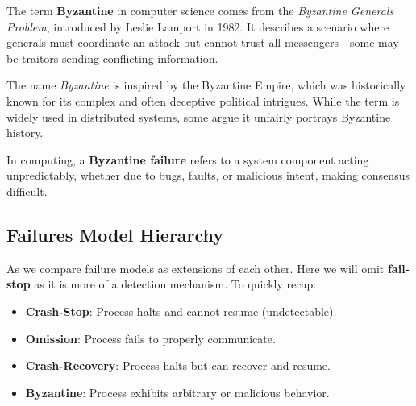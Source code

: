 \begin{Tip} The term \textbf{Byzantine} in computer science comes from the \textit{Byzantine Generals Problem}, introduced by Leslie Lamport in 1982. It describes a scenario where generals must coordinate an attack but cannot trust all messengers—some may be traitors sending conflicting information.

    The name \textit{Byzantine} is inspired by the Byzantine Empire, which was historically known for its complex and often deceptive political intrigues. While the term is widely used in distributed systems, some argue it unfairly portrays Byzantine history.

    In computing, a \textbf{Byzantine failure} refers to a system component acting unpredictably, whether due to bugs, faults, or malicious intent, making consensus difficult.

\end{Tip}

\newpage

\subsection{Failures Model Hierarchy}

As we compare failure models as extensions of each other. Here we will omit \textbf{fail-stop} as it is more of a detection mechanism.
To quickly recap:
\begin{itemize}
    \item \textbf{Crash-Stop}: Process halts and cannot resume (undetectable).
    \item \textbf{Omission}: Process fails to properly communicate.
    \item \textbf{Crash-Recovery}: Process halts but can recover and resume.
    \item \textbf{Byzantine}: Process exhibits arbitrary or malicious behavior.
\end{itemize}

